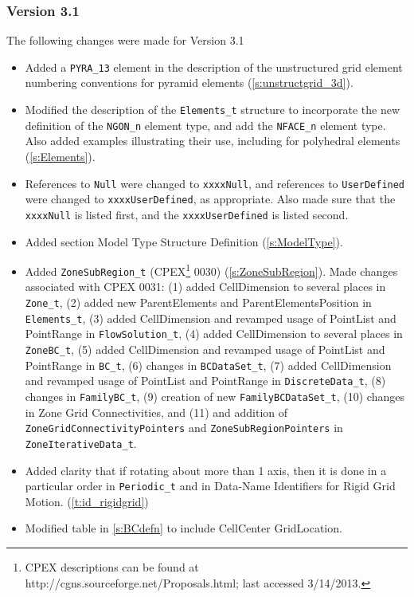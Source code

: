 \subsubsection{Version 3.1}
The following changes were made for Version 3.1

\begin{itemize}
\item Added a \texttt{PYRA\_13} element in the description of the unstructured grid 
      element numbering conventions for pyramid elements
      (\autoref{s:unstructgrid_3d}).
\item Modified the description of the \texttt{Elements\_t} structure to incorporate 
      the new definition of the \texttt{NGON\_n} element type, and add the 
      \texttt{NFACE\_n} element type. Also added examples illustrating their use, 
      including for polyhedral elements
      (\autoref{s:Elements}).
\item References to \texttt{Null} were changed to \texttt{xxxxNull}, and references to 
      \texttt{UserDefined} were changed to \texttt{xxxxUserDefined}, as appropriate. 
      Also made sure that the \texttt{xxxxNull} is listed first, and the 
      \texttt{xxxxUserDefined} is listed second.
\item Added section Model Type Structure Definition
      (\autoref{s:ModelType}).
\item Added \texttt{ZoneSubRegion\_t} (CPEX\footnote{CPEX descriptions can be found
      at http://cgns.sourceforge.net/Proposals.html; last accessed 3/14/2013.}
      0030) (\autoref{s:ZoneSubRegion}). 
      Made changes associated with CPEX 
      0031: (1) added CellDimension to several places in \texttt{Zone\_t}, (2) added 
      new ParentElements and ParentElementsPosition in \texttt{Elements\_t}, 
      (3) added CellDimension and revamped usage of PointList and PointRange in 
      \texttt{FlowSolution\_t}, (4) added CellDimension to several places in 
      \texttt{ZoneBC\_t}, (5) added CellDimension and revamped usage of PointList 
      and PointRange in \texttt{BC\_t}, (6) changes in \texttt{BCDataSet\_t}, 
      (7) added CellDimension and revamped usage of PointList and PointRange in 
      \texttt{DiscreteData\_t}, (8) changes in \texttt{FamilyBC\_t}, (9) creation 
      of new \texttt{FamilyBCDataSet\_t}, (10) changes in Zone Grid Connectivities, 
      and (11) and addition of \texttt{ZoneGridConnectivityPointers} and 
      \texttt{ZoneSubRegionPointers} in \texttt{ZoneIterativeData\_t}. 
\item Added clarity that if rotating about more than 1 axis, then it is done in a 
      particular order in \texttt{Periodic\_t} and in Data-Name Identifiers for 
      Rigid Grid Motion. 
      (\autoref{t:id_rigidgrid})
\item Modified table in \autoref{s:BCdefn} to include CellCenter GridLocation.
\end{itemize}

